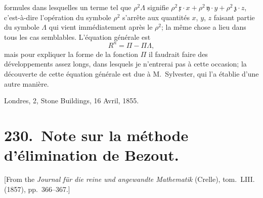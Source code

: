 \documentclass[11pt,a4paper]{book}
\theoremstyle{plain}
\begin{document}
formules dans lesquelles un terme tel que $\rho^2\Lambda$ signifie $\rho^2\,\mathfrak{x}\cdot x+\rho^2\,\mathfrak{y}\cdot y+\rho^2\,\mathfrak{z}\cdot z$, c'est-\`{a}-dire l'op\'{e}ration du symbole $\rho^2$ s'arr\^{e}te aux quantit\'{e}s $x$, $y$, $z$ faisant partie du symbole $\Lambda$ qui vient imm\'{e}diatement apr\`{e}s le $\rho^2$; la m\^{e}me chose a lieu dans tous les cas semblables. L'\'{e}quation g\'{e}n\'{e}rale est
\[
R^n=\Pi-\Pi\Lambda,
\]
mais pour expliquer la forme de la fonction $\Pi$ il faudrait faire des d\'{e}veloppements assez longs, dans lesquels je n'entrerai pas \`{a} cette occasion; la d\'{e}couverte de cette \'{e}quation g\'{e}n\'{e}rale est due \`{a} M.~Sylvester, qui l'a \'{e}tablie d'une autre mani\`{e}re.

\begin{flushright}
Londres, 2, Stone Buildings, 16 Avril, 1855.
\end{flushright}
\newpage

\chapter[Note sur la m\'{e}thode d'\'{e}limination de Bezout]{230.\ Note sur la m\'{e}thode d'\'{e}limination de Bezout.}
\label{paper230}

\begin{center}
\small
[From the \textit{Journal f\"{u}r die reine und angewandte Mathematik} (Crelle), tom.~LIII. (1857), pp.~366--367.]
\end{center}

\bigskip
\end{document}
